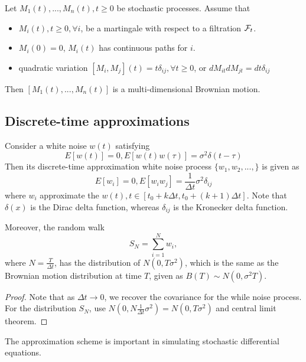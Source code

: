 \begin{refsection}
\begin{theorem}\cite[168]{shreve2004stochastic2}
	Let $M_1(t),...,M_n(t),t\geq 0$ be stochastic processes. Assume that
	\begin{itemize}
		\item $M_i(t),t\geq 0,\forall i$, be a martingale with respect to a filtration $\mathcal{F}_t$.
		\item $M_i(0) = 0$, $M_i(t)$ has continuous paths for $i$.
		\item quadratic variation $[M_i,M_j](t) = t\delta_{ij},\forall t\geq 0$, or $dM_{it} dM_{jt} = dt\delta_{ij}$
	\end{itemize}
	Then $[M_1(t),...,M_n(t)]$ is a multi-dimensional Brownian motion. 
\end{theorem}




\subsection{Discrete-time approximations}

\begin{lemma}
	Consider a white noise $w(t)$ satisfying
	$$E[w(t)] = 0, E[w(t)w(\tau)] = \sigma^2\delta(t-\tau)$$
	Then its discrete-time approximation white noise process $\{w_1,w_2,...,\}$ is given as
	$$E[w_i] = 0, E[w_iw_j] = \frac{1}{\Delta t} \sigma^2 \delta_{ij}$$
	where $w_i$ approximate the $w(t),t\in [t_0 + k\Delta t, t_0 + (k+1)\Delta t]$.
	Note that $\delta(x)$ is the Dirac delta function, whereas $\delta_{ij}$ is the Kronecker delta function.
	
	Moreover, the random walk $$S_N = \sum_{i=1}^N w_i,$$ 
	where $N = \frac{T}{\Delta t}$, has the distribution of $N(0,T\sigma^2)$, which is the same as the Brownian motion distribution at time $T$, given as $B(T)\sim  N(0,\sigma^2 T)$.
\end{lemma}
\begin{proof}
	Note that as $\Delta t \to 0$, we recover the covariance for the while noise process. For the distribution $S_N$, use $N(0, N \frac{1}{\Delta t}\sigma^2) = N(0,T\sigma^2)$ and central limit theorem.
\end{proof}


\begin{remark}[implications]
	The approximation scheme is important in simulating stochastic differential equations.
\end{remark}




\end{refsection}
